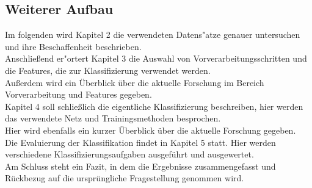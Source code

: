 \subsection{Weiterer Aufbau}
\label{Weiterer Aufbau}
	Im folgenden wird Kapitel 2 die verwendeten Datens"atze genauer untersuchen und ihre Beschaffenheit beschrieben.\\
	Anschlie{\ss}end er"ortert Kapitel 3 die Auswahl von Vorverarbeitungsschritten und die Features, die zur Klassifizierung verwendet werden. \\
	Au{\ss}erdem wird ein {\"U}berblick über die aktuelle Forschung im Bereich Vorverarbeitung und Features gegeben. \\
	Kapitel 4 soll schlie{\ss}lich die eigentliche Klassifizierung beschreiben, hier werden das verwendete Netz und Trainingsmethoden besprochen. \\
	Hier wird ebenfalls ein kurzer {\"U}berblick über die aktuelle Forschung gegeben.\\
	Die Evaluierung der Klassifikation findet in Kapitel 5 statt. Hier werden verschiedene Klassifizierungsaufgaben ausgef{\"u}hrt und ausgewertet.\\
	Am Schluss steht ein Fazit, in dem die Ergebnisse zusammengefasst und R{\"u}ckbezug auf die urspr{\"u}ngliche Fragestellung genommen wird.\\